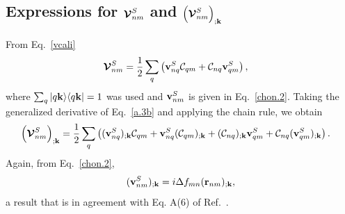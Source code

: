 \documentclass[floatfix,prb,aps,superscriptaddress,11pt,preprint,letterpaper]{revtex4}
\begin{document}
\subsection{Expressions for  \texorpdfstring{$\boldsymbol{\mathcal{\cal V}}^{S}_{nm}$}{Vnm}
and
\texorpdfstring{$\Big({\boldsymbol{\mathcal{\cal V}}}^{S}_{nm}\Big)_{;\mathbf{k}}$}{(Vnm);kb}
}\label{calvs} 

From Eq.~\eqref{vcali}
\begin{align}\label{a.3b}
\boldsymbol{\mathcal{\cal V}}^{S}_{nm}
&=
\frac{1}{2}\sum_q\left(   
\mathbf{v}^S_{nq}{\mathbf{\cal C}}_{qm}+{\mathbf{\cal C}}_{nq}\mathbf{v}^S_{qm}
\right)  
,
\end{align}    
where $\sum_q| q\mathbf{k} \rangle\langle q\mathbf{k} |=1$ was used
and $\mathbf{v}^S_{nm}$ is given in Eq.~\eqref{chon.2}.
Taking the generalized derivative of Eq.~\eqref{a.3b}
and applying
the chain rule, we obtain
\begin{align}\label{a.3bn}
\left(\boldsymbol{\mathcal{\cal V}}^{S}_{nm}\right)_{;\mathbf{k}}
&=
\frac{1}{2}\sum_q\left(
(\mathbf{v}^S_{nq})_{;\mathbf{k}}{\mathbf{\cal C}}_{qm}
+    
\mathbf{v}^S_{nq}({\mathbf{\cal C}}_{qm})_{;\mathbf{k}}
+
({\mathbf{\cal C}}_{nq})_{;\mathbf{k}} \mathbf{v}^S_{qm}
+
{\mathbf{\cal C}}_{nq} (\mathbf{v}^S_{qm})_{;\mathbf{k}}
\right)  
.
\end{align}    
Again, from
Eq.~\eqref{chon.2}, 
\begin{align}\label{choni.1}
(\mathbf{v}^S_{nm})_{;\mathbf{k}}=i\Delta f_{mn}
(\mathbf{r}_{nm})_{;\mathbf{k}}
,
\end{align}
a result that is in agreement with Eq. A(6) of Ref.~.

\newpage

\end{document}
